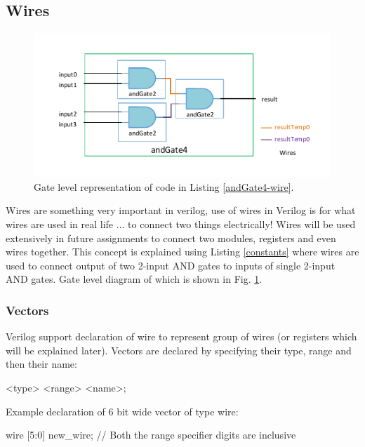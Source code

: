 \documentclass[a4paper,10pt]{article}
\theoremstyle{mytheor}
\newcommand{
  \insertverilog}[3]{
  
}
\begin{document}
\subsection*{Wires}

\begin{figure}[!h] \centering  
  \includegraphics[width=\linewidth]{./resources/andGate4_representation.pdf}
  \caption{Gate level representation of code in Listing \ref{andGate4-wire}.} 
  \label{Fig:andGate4-representation}
\end{figure}

Wires are something very important in verilog, use of wires in Verilog is for what wires are used in real life ... to connect two things electrically! Wires will be used extensively in future assignments to connect two modules, registers and even wires together. This concept is explained using Listing \ref{constants} where wires are used to connect output of two 2-input AND gates to inputs of single 2-input AND gates. Gate level diagram of which is shown in Fig. \ref{Fig:andGate4-representation}.

\insertverilog{./verilog_files/andGate4.v}{andGate4-wire}{\text{Use of wires to connect output of one module to input of another}}

\subsubsection*{Vectors}
Verilog support declaration of wire to represent group of wires (or registers which will be explained later). Vectors are declared by specifying their type, range and then their name:
\begin{center}
  <type> <range> <name>;
\end{center}

Example declaration of 6 bit wide vector of type wire:
\begin{center}
  {\color{blue} wire} [{\color{orange}5}:{\color{orange}0}] new\_wire; {\color{vgreen}// Both the range specifier digits are inclusive}
\end{center}
\end{document}
